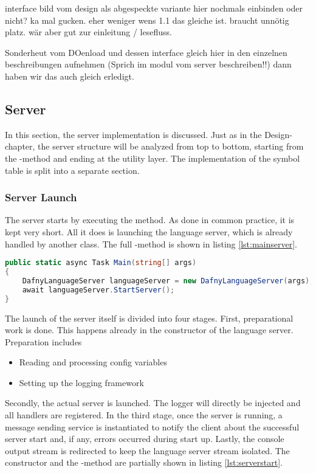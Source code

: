 interface bild vom design als abgespeckte variante hier nochmals einbinden oder nicht? ka mal gucken. eher weniger wens 1.1 das gleiche ist. braucht unnötig platz. wär aber gut zur einleitung / lesefluss.

Sonderheut vom DOenload und dessen interface gleich hier in den einzelnen beschreibungen aufnehmen (Sprich im modul vom server beschreiben!!) dann haben wir das auch gleich erledigt.



\subsection{Server}
In this section, the server implementation is discussed.
Just as in the Design-chapter, the server structure will be analyzed from top to bottom, starting from the -method and ending at the utility layer.
The implementation of the symbol table is split into a separate section.

\subsubsection{Server Launch}
The server starts by executing the  method.
As done in common practice, it is kept very short.
All it does is launching the language server, which is already handled by another class.
The full -method is shown in listing \ref{lst:mainserver}.

\begin{lstlisting}[language=csharp, caption={Main Function}, captionpos=b, label={lst:mainserver}]
public static async Task Main(string[] args)
{
    DafnyLanguageServer languageServer = new DafnyLanguageServer(args);
    await languageServer.StartServer();
}
\end{lstlisting}

The launch of the server itself is divided into four stages.
First, preparational work is done.
This happens already in the constructor of the language server.
Preparation includes
\begin{itemize}
    \item Reading and processing config variables
    \item Setting up the logging framework
\end{itemize}
Secondly, the actual server is launched.
The logger will directly be injected and all handlers are registered.
In the third stage, once the server is running, a message sending service is instantiated to notify the client about the successful server start and, if any, errors occurred during start up.
Lastly, the console output stream is redirected to keep the language server stream isolated.
The constructor and the -method are partially shown in listing \ref{lst:serverstart}.

